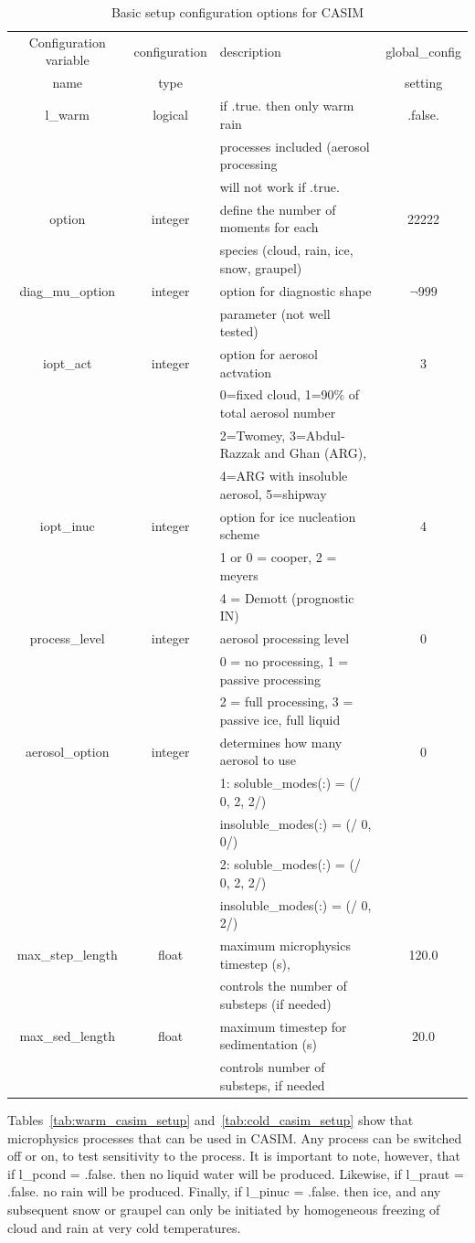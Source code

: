 \documentclass[a4paper,11pt]{article}
\begin{document}
\begin{table}[H]
  \protect\caption{Basic setup configuration options for CASIM}
\label{tab:casim_setup}
\begin{tabular}{|c|c|p{7cm}|c|}
\hline
Configuration variable & configuration & description & global\_config \tabularnewline
name & type & & setting \tabularnewline
\hline
\hline
  l\_warm & logical & if .true. then only warm rain & .false. \tabularnewline
    &  & processes included (aerosol processing &  \tabularnewline
    &  & will not work if .true. & \tabularnewline
  option & integer & define the number of moments for each & 22222  \tabularnewline
   &   & species (cloud, rain, ice, snow, graupel) &  \tabularnewline
\hline
  diag\_mu\_option & integer & option for diagnostic shape & $\neg{999}$ \tabularnewline
   &  &  parameter (not well tested) &  \tabularnewline
\hline
  iopt\_act & integer & option for aerosol actvation & 3 \tabularnewline
   &  &  0=fixed cloud, 1=90\% of total aerosol number & \tabularnewline
   &  &  2=Twomey, 3=Abdul-Razzak and Ghan (ARG),   & \tabularnewline
   &  &  4=ARG with insoluble aerosol, 5=shipway  & \tabularnewline
\hline
  iopt\_inuc & integer & option for ice nucleation scheme & 4 \tabularnewline
   &  & 1 or 0 = cooper, 2 = meyers & \tabularnewline
   &  & 4 = Demott (prognostic IN) & \tabularnewline
\hline
  process\_level & integer & aerosol processing level & 0 \tabularnewline
   &  & 0 = no processing, 1 = passive processing & \tabularnewline
   &  & 2 = full processing, 3 = passive ice, full liquid & \tabularnewline
\hline
  aerosol\_option & integer & determines how many aerosol to use & 0 \tabularnewline
   &  & 1: soluble\_modes(:) = (/ 0, 2, 2/) &  \tabularnewline
   &  & insoluble\_modes(:) = (/ 0, 0/)  &   \tabularnewline
   &  & 2: soluble\_modes(:) = (/ 0, 2, 2/)  &  \tabularnewline
   &  & insoluble\_modes(:) = (/ 0, 2/)  &   \tabularnewline
\hline
  max\_step\_length & float & maximum microphysics timestep (s), & 120.0 \tabularnewline
   &  &  controls the number of substeps (if needed) & \tabularnewline
\hline
  max\_sed\_length & float & maximum timestep for sedimentation (s) & 20.0 \tabularnewline
   &  &  controls number of substeps, if needed  &  \tabularnewline
\hline
\hline
\end{tabular}
\end{table}

Tables~\ref{tab:warm_casim_setup} and~\ref{tab:cold_casim_setup} show that
microphysics processes that can be used in CASIM. Any process can be switched
off or on, to test sensitivity to the process. It is important to note, however,
that if l\_pcond = .false. then no liquid water will be produced. Likewise,
if l\_praut = .false. no rain will be produced. Finally, if l\_pinuc = .false. then
ice, and any subsequent snow or graupel can only be initiated by homogeneous
freezing of cloud and rain at very cold temperatures.
\end{document}
